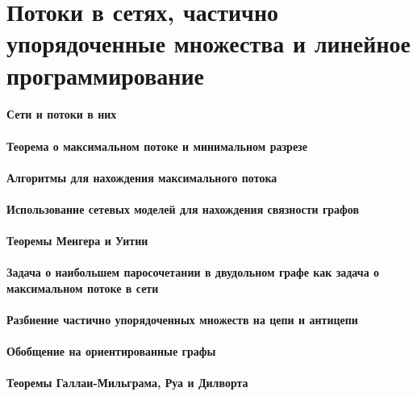 \documentclass[russian,twocolumn]{article}
\begin{document}
\section{Потоки в сетях, частично упорядоченные множества и линейное программирование}

\paragraph{Сети и потоки в них}

\paragraph{Теорема о максимальном потоке и минимальном разрезе}

\paragraph{Алгоритмы для нахождения максимального потока}

\paragraph{Использование сетевых моделей для нахождения связности графов}

\paragraph{Теоремы Менгера и Уитни}

\paragraph{Задача о наибольшем паросочетании в двудольном графе как задача о максимальном потоке в сети}

\paragraph{Разбиение частично упорядоченных множеств на цепи и антицепи}

\paragraph{Обобщение на ориентированные графы}

\paragraph{Теоремы Галлаи-Мильграма, Руа и Дилворта}
\end{document}
